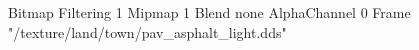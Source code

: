 {Bitmap
	{Filtering 1}
	{Mipmap 1}
	{Blend none}
	{AlphaChannel 0}
	{Frame "/texture/land/town/pav_asphalt_light.dds"}
}
